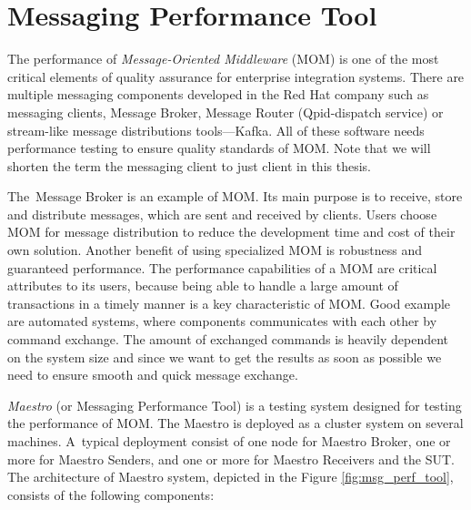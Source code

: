 
\chapter{Messaging Performance Tool}
\label{Messaging Performance Tool}
The performance of \emph{Message-Oriented Middleware} (MOM) \cite{CURRY:MOM} is one of the most critical elements of quality assurance for enterprise integration systems. There are multiple messaging components developed in the Red Hat company such as messaging clients, Message Broker, Message Router (Qpid-dispatch service) or stream-like message distributions tools---Kafka. All of these software needs performance testing to ensure quality standards of MOM. Note that we will shorten the term the messaging client to just client in this thesis.

The~Message Broker is an example of MOM. Its main purpose is to receive, store and distribute messages, which are sent and received by clients. Users choose MOM for message distribution to reduce the development time and cost of their own solution. Another benefit of using specialized MOM is robustness and guaranteed performance. The performance capabilities of a MOM are critical attributes to its users, because being able to handle a large amount of transactions in a timely manner is a key characteristic of MOM. Good example are automated systems, where components communicates with each other by command exchange. The amount of exchanged commands is heavily dependent on the system size and since we want to get the results as soon as possible we need to ensure smooth and quick message exchange.

\emph{Maestro} (or Messaging Performance Tool) \cite{ORPISKE:MSGPT} is a testing system designed for testing the performance of MOM. The Maestro is deployed as a cluster system on several machines. A~typical deployment consist of one node for Maestro Broker, one or more for Maestro Senders, and one or more for Maestro Receivers and the SUT. The architecture of Maestro system, depicted in the Figure \ref{fig:msg_perf_tool}, consists of the following components:

